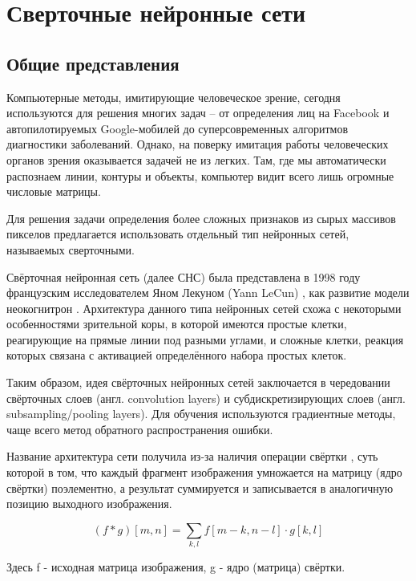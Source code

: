 \documentclass[14pt]{article}
\numberwithin{figure}{section}
\numberwithin{equation}{section}
\begin{document}
\newpage

\section{Сверточные нейронные сети}

\subsection{Общие представления}

Компьютерные методы, имитирующие человеческое зрение, сегодня используются для решения многих задач – от определения лиц на Facebook и автопилотируемых Google-мобилей до суперсовременных алгоритмов диагностики заболеваний. Однако, на поверку имитация работы человеческих органов зрения оказывается задачей не из легких. Там, где мы автоматически распознаем линии, контуры и объекты, компьютер видит всего лишь огромные числовые матрицы.

Для решения задачи определения более сложных признаков из сырых массивов пикселов предлагается использовать отдельный тип нейронных сетей, называемых сверточными.

Свёрточная нейронная сеть (далее СНС) была представлена в 1998 году французским исследователем Яном Лекуном (Yann LeCun)%
, как развитие модели неокогнитрон \cite{Fukushima}. Архитектура данного типа нейронных сетей схожа с некоторыми особенностями зрительной коры, в которой имеются простые клетки, реагирующие на прямые линии под разными углами, и сложные клетки, реакция которых связана с активацией определённого набора простых клеток.

Таким образом, идея свёрточных нейронных сетей заключается в чередовании свёрточных слоев (англ. convolution layers) и субдискретизирующих слоев (англ. subsampling/pooling layers). Для обучения используются градиентные методы, чаще всего метод обратного распространения ошибки.

Название архитектура сети получила из-за наличия операции свёртки%
, суть которой в том, что каждый фрагмент изображения умножается на матрицу (ядро свёртки) поэлементно, а результат суммируется и записывается в аналогичную позицию выходного изображения.

\begin{equation}
	(f * g)[m, n] = \sum_{k,l}{f[m - k, n - l] \cdot g[k, l]}
\end{equation}

Здесь f - исходная матрица изображения, g - ядро (матрица) свёртки.
\end{document}
